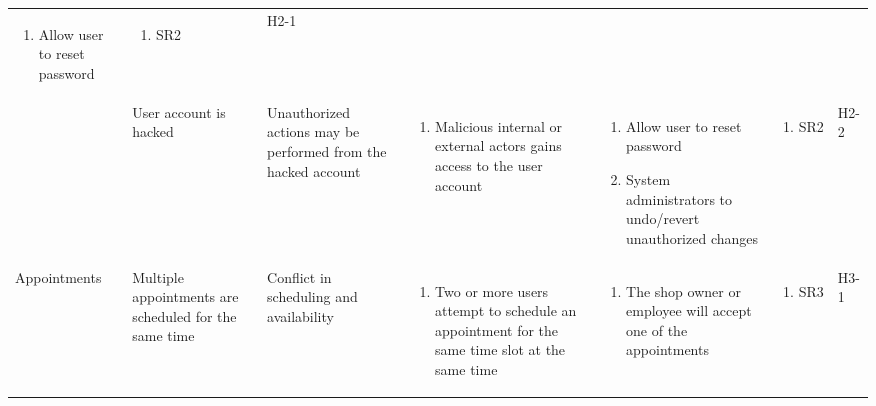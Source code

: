 \documentclass{article}
\begin{document}
\begin{landscape}
\begin{longtable}{|p{}|p{}|p{}|p{}|p{}|p{}|p{}|}
\begin{enumerate}[label=\alph*., leftmargin=*]
			   \item Allow user to reset password
		   \end{enumerate}
		 & \begin{enumerate}[label=\alph*., leftmargin=*]
			   \item SR2
		   \end{enumerate}
		 & H2-1                                                                                                         \\
		\cline{2-7}
		 & User account is hacked
		 & Unauthorized actions may be performed from the hacked account
		 & \begin{enumerate}[label=\alph*., leftmargin=*]
			   \item Malicious internal or external actors gains access to the user account
		   \end{enumerate}
		 & \begin{enumerate}[label=\alph*., leftmargin=*]
			   \item Allow user to reset password
			   \item System administrators to undo/revert unauthorized changes
		   \end{enumerate}
		 & \begin{enumerate}[label=\alph*., leftmargin=*]
			   \item SR2
		   \end{enumerate}
		 & H2-2                                                                                                         \\
		\hline
		Appointments
		 & Multiple appointments are scheduled for the same time
		 & Conflict in scheduling and availability
		 & \begin{enumerate}[label=\alph*., leftmargin=*]
			   \item Two or more users attempt to schedule an appointment for the same time slot at the same time
		   \end{enumerate}
		 & \begin{enumerate}[label=\alph*., leftmargin=*]
			   \item The shop owner or employee will accept one of the appointments
		   \end{enumerate}
		 & \begin{enumerate}[label=\alph*., leftmargin=*]
			   \item SR3
		   \end{enumerate}
		 & H3-1                                                                                                         \\

\end{longtable}
\end{landscape}
\end{document}
